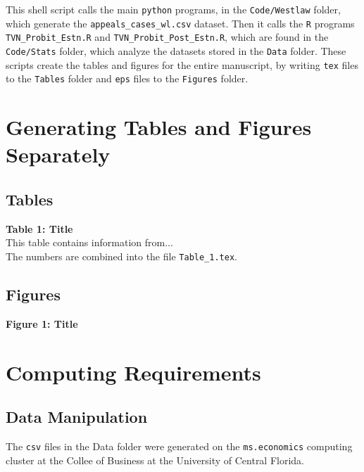 \documentclass[11pt]{paper}
\begin{document}
This shell script calls the main 
\texttt{python} programs, in the \texttt{Code/Westlaw} folder, 
which generate the \texttt{appeals\_cases\_wl.csv} dataset. 
Then it calls the 
\texttt{R} programs 
\texttt{TVN\_Probit\_Estn.R} and \texttt{TVN\_Probit\_Post\_Estn.R}, 
which are found in the \texttt{Code/Stats} folder, 
which analyze the datasets stored in the \texttt{Data} folder. 
These scripts create the tables and figures for the entire manuscript,
by writing \texttt{tex} files to the \texttt{Tables} folder and
 \texttt{eps} files to the \texttt{Figures} folder. 



  

\section*{Generating Tables and Figures Separately}

\subsection*{Tables}

\noindent\textbf{Table 1: Title} \\

This table contains information from... \\


The numbers are combined into the file \texttt{Table\_1.tex}. \\


\subsection*{Figures}

\noindent\textbf{Figure 1: Title} \\




\section*{Computing Requirements}

\subsection*{Data Manipulation}

The \texttt{csv} files in the Data folder 
were generated on the 
\texttt{ms.economics} computing cluster
at the Collee of Business
at the University of Central Florida. 
\end{document}
